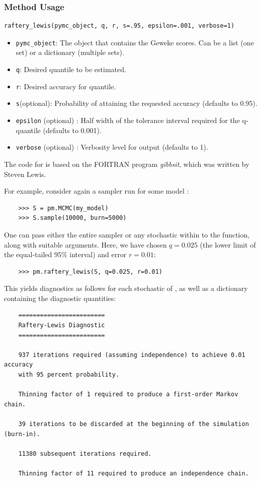 \subsubsection*{Method Usage}
\begin{verbatim}
raftery_lewis(pymc_object, q, r, s=.95, epsilon=.001, verbose=1)
\end{verbatim}
\begin{itemize}

	\item \verb=pymc_object=: The object that contains the Geweke scores. Can be a list (one set) or a dictionary (multiple sets).

    \item \verb=q=: Desired quantile to be estimated.

    \item \verb=r=: Desired accuracy for quantile.

    \item \verb=s=(optional): Probability of attaining the requested accuracy (defaults to 0.95).

    \item \verb=epsilon= (optional) : Half width of the tolerance interval required for the q-quantile (defaults to 0.001).

    \item \verb=verbose= (optional) : Verbosity level for output (defaults to 1).
\end{itemize}

The code for  is based on the FORTRAN program \emph{gibbsit}, which was written by Steven Lewis.

For example, consider again a sampler  run for some model :
\begin{verbatim}
	>>> S = pm.MCMC(my_model)
	>>> S.sample(10000, burn=5000)
\end{verbatim}
One can pass either the entire sampler  or any stochastic within  to the  function, along with suitable arguments. Here, we have chosen $q=0.025$ (the lower limit of the equal-tailed 95\% interval) and error $r=0.01$:
\begin{verbatim}
	>>> pm.raftery_lewis(S, q=0.025, r=0.01)
\end{verbatim}
This yields diagnostics as follows for each stochastic of , as well as a dictionary containing the diagnostic quantities:

\begin{verbatim}
	========================
	Raftery-Lewis Diagnostic
	========================

	937 iterations required (assuming independence) to achieve 0.01 accuracy
	with 95 percent probability.

	Thinning factor of 1 required to produce a first-order Markov chain.

	39 iterations to be discarded at the beginning of the simulation (burn-in).

	11380 subsequent iterations required.

	Thinning factor of 11 required to produce an independence chain.
\end{verbatim}

